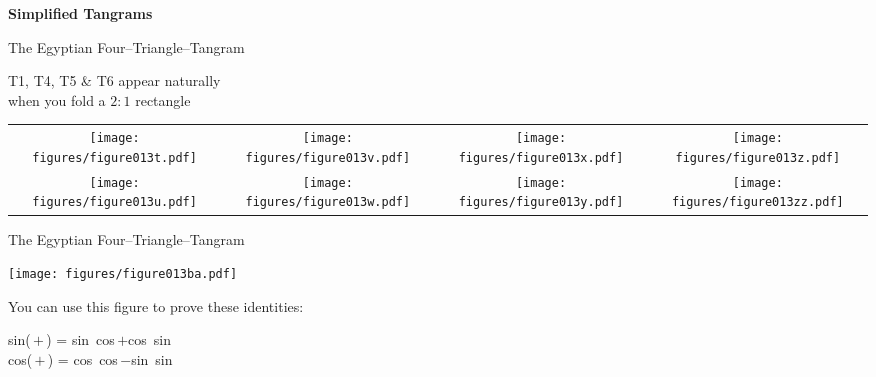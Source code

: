 \documentclass[14pt]{beamer}
\begin{document}
    \begin{frame}{}
        \begin{center}
            \textbf{\Huge Simplified Tangrams}\\
        \end{center}
    \end{frame}


    \begin{frame}{The Egyptian Four--Triangle--Tangram}
        \begin{center}
            T1, T4, T5 \& T6 appear naturally\\[1ex]when you fold a $2\!:\!1$ rectangle
            \bigskip\bigskip

            \begin{tabular}{cccc}
                \texttt{[image: figures/figure013t.pdf]} &
                \texttt{[image: figures/figure013v.pdf]} &
                \texttt{[image: figures/figure013x.pdf]} &
                \texttt{[image: figures/figure013z.pdf]} \\[2ex]
                \texttt{[image: figures/figure013u.pdf]} &
                \texttt{[image: figures/figure013w.pdf]} &
                \texttt{[image: figures/figure013y.pdf]} &
                \texttt{[image: figures/figure013zz.pdf]} \\
            \end{tabular}

            \bigskip\bigskip
        \end{center}
    \end{frame}


    \begin{frame}{The Egyptian Four--Triangle--Tangram}
        \begin{center}
            \texttt{[image: figures/figure013ba.pdf]}

            \bigskip
            You can use this figure to prove these identities:
            \bigskip

            {\small sin(\textalpha\,$+$\,\textbeta) = sin\,\textalpha\,\,cos\,\textbeta\;$+$\;cos\,\textalpha\,\,sin\,\textbeta\\[1ex]
            cos(\textalpha\,$+$\,\textbeta) = cos\,\textalpha\,\,cos\,\textbeta\;$-$\;sin\,\textalpha\,\,sin\,\textbeta\;}
        \end{center}
    \end{frame}
\end{document}
